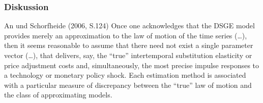 \documentclass{beamer} %
\begin{document}
\begin{frame}\frametitle{Diskussion}

\begin{block}{An und Schorfheide (2006, S.124)}
Once one acknowledges that the DSGE model provides merely an approximation to
the law of motion of the time series (\dots), then it seems reasonable to
assume that there need not exist a single parameter vector (\dots), that
delivers, say, the \enquote{true} intertemporal substitution elasticity or
price adjustment costs and, simultaneously, the most precise impulse
responses to a technology or monetary policy shock. Each estimation method is
associated with a particular measure of discrepancy between the
\enquote{true} law of motion and the class of approximating models.
\end{block}
\end{frame}
\end{document}
